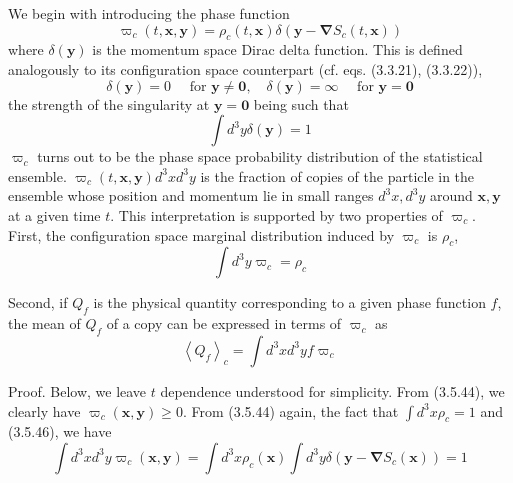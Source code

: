\documentclass{article}
\begin{document}
We begin with introducing the phase function
$$
\begin{equation*}
\varpi_{c}(t, \boldsymbol{x}, \boldsymbol{y})=\rho_{c}(t, \boldsymbol{x}) \delta\left(\boldsymbol{y}-\boldsymbol{\nabla} S_{c}(t, \boldsymbol{x})\right) \tag{3.5.44}
\end{equation*}
$$
where $\delta(\boldsymbol{y})$ is the momentum space Dirac delta function. This is defined analogously to its configuration space counterpart (cf. eqs. (3.3.21), (3.3.22)),
$$
\begin{equation*}
\delta(\boldsymbol{y})=0 \quad \text { for } \boldsymbol{y} \neq \mathbf{0}, \quad \delta(\boldsymbol{y})=\infty \quad \text { for } \boldsymbol{y}=\mathbf{0} \tag{3.5.45}
\end{equation*}
$$
the strength of the singularity at $\boldsymbol{y}=\mathbf{0}$ being such that
$$
\begin{equation*}
\int d^{3} y \delta(\boldsymbol{y})=1 \tag{3.5.46}
\end{equation*}
$$
$\varpi_{c}$ turns out to be the phase space probability distribution of the statistical ensemble. $\varpi_{c}(t, \boldsymbol{x}, \boldsymbol{y}) d^{3} x d^{3} y$ is the fraction of copies of the particle in the ensemble whose position and momentum lie in small ranges $d^{3} x, d^{3} y$ around $\boldsymbol{x}, \boldsymbol{y}$ at a given time $t$. This interpretation is supported by two properties of $\varpi_{c}$. First, the configuration space marginal distribution induced by $\varpi_{c}$ is $\rho_{c}$,
$$
\begin{equation*}
\int d^{3} y \varpi_{c}=\rho_{c} \tag{3.5.47}
\end{equation*}
$$

Second, if $Q_{f}$ is the physical quantity corresponding to a given phase function $f$, the mean of $Q_{f}$ of a copy can be expressed in terms of $\varpi_{c}$ as
$$
\begin{equation*}
\left\langle Q_{f}\right\rangle_{c}=\int d^{3} x d^{3} y f \varpi_{c} \tag{3.5.48}
\end{equation*}
$$

Proof. Below, we leave $t$ dependence understood for simplicity. From (3.5.44), we clearly have $\varpi_{c}(\boldsymbol{x}, \boldsymbol{y}) \geq 0$. From (3.5.44) again, the fact that $\int d^{3} x \rho_{c}=1$ and (3.5.46), we have
$$
\begin{equation*}
\int d^{3} x d^{3} y \varpi_{c}(\boldsymbol{x}, \boldsymbol{y})=\int d^{3} x \rho_{c}(\boldsymbol{x}) \int d^{3} y \delta\left(\boldsymbol{y}-\boldsymbol{\nabla} S_{c}(\boldsymbol{x})\right)=1 \tag{3.5.49}
\end{equation*}
$$
\end{document}

